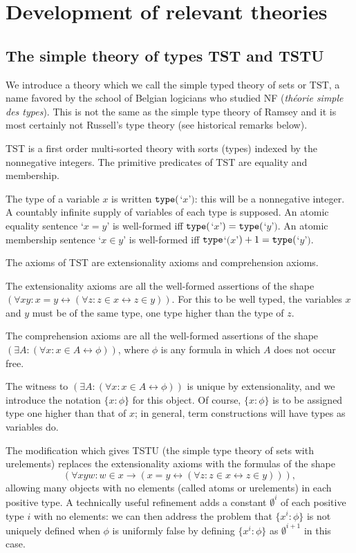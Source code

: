 \documentclass[112pt]{article}
\begin{document}

\section{Development of relevant theories}

\subsection{The simple theory of types TST and TSTU}

We introduce a theory which we call the simple typed theory of sets or TST, a name favored by the school of Belgian logicians who studied NF ({\em th\'eorie simple des types}).  This is not the same as the simple type theory of Ramsey and it is most certainly not Russell's type theory  (see historical remarks below).

TST is a first order multi-sorted theory with sorts (types) indexed by the nonnegative integers.  The primitive predicates of TST are equality and membership.

The type of a variable $x$ is written ${\tt type}($`$x$'$)$:  this will be a nonnegative integer.   A countably infinite supply of variables of each type is supposed.  An atomic equality sentence `$x=y$' is well-formed iff ${\tt type}($`$x$'$)={\tt type}($`$y$'$)$.
An atomic membership sentence `$x \in y$' is well-formed iff ${\tt type}$`$(x$'$)+1 = {\tt type}($`$y$'$)$.

The axioms of TST are extensionality axioms and comprehension axioms.

The extensionality axioms are all the well-formed assertions of the shape $(\forall xy:x=y \leftrightarrow (\forall z:z \in x \leftrightarrow z\in y))$.  For this to be well typed, the variables
$x$ and $y$ must be of the same type, one type higher than the type of $z$.

The comprehension axioms are all the well-formed assertions of the shape $(\exists A:(\forall x:x \in A \leftrightarrow \phi))$, where $\phi$ is any formula in which $A$ does not occur free.

The witness to $(\exists A:(\forall x:x \in A \leftrightarrow \phi))$ is unique by extensionality, and we introduce the notation $\{x:\phi\}$ for this object.  Of course, $\{x:\phi\}$  is to be assigned type one higher than that of $x$;  in general, term constructions will have types as variables do.

The modification which gives TSTU (the simple type theory of sets with urelements) replaces the extensionality axioms with the formulas of the shape $$(\forall xyw:w \in x \rightarrow (x=y \leftrightarrow (\forall z:z \in x \leftrightarrow z\in y))),$$  allowing many objects with no elements (called atoms or urelements)  in each positive type.  A technically useful refinement adds a constant $\emptyset^i$ of each positive type $i$ with no elements:  we can then address the problem that $\{x^i:\phi\}$ is not uniquely defined when $\phi$ is uniformly false by defining $\{x^i:\phi\}$ as $\emptyset^{i+1}$ in this case.
\end{document}
